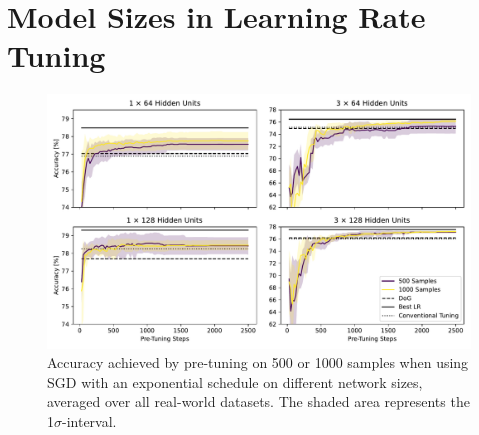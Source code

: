 \documentclass[letterpaper]{article} %
\begin{document}
\section{Model Sizes in Learning Rate Tuning}\label{app:pretune_model_sizes}

\begin{figure}[h]
	\centering
	\includegraphics[width=.47\textwidth]{figures/pretune_architectures_exp_schedule.pdf}
	\caption{Accuracy achieved by pre-tuning on 500 or 1000 samples when using SGD with an exponential schedule on different network sizes, averaged over all real-world datasets. The shaded area represents the 1$\sigma$-interval.}
\end{figure}
\end{document}
